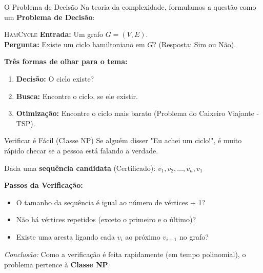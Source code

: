 \documentclass[10pt, aspectratio=169]{beamer}
\begin{document}
\begin{frame}{O Problema de Decisão}
    Na teoria da complexidade, formulamos a questão como um \textbf{Problema de Decisão}:
    
    \vspace{1em}
    \begin{block}{\textsc{HamCycle}}
        \textbf{Entrada:} Um grafo $G = (V, E)$.\\
        \textbf{Pergunta:} Existe um ciclo hamiltoniano em $G$? (Resposta: Sim ou Não).
    \end{block}
    
    \vspace{1em}
    \textbf{Três formas de olhar para o tema:}
    \begin{enumerate}
        \item \textbf{Decisão:} O ciclo existe?
        \item \textbf{Busca:} Encontre o ciclo, se ele existir.
        \item \textbf{Otimização:} Encontre o ciclo mais barato (Problema do Caixeiro Viajante - TSP).
    \end{enumerate}
\end{frame}

\begin{frame}{Verificar é Fácil (Classe NP)}
    Se alguém disser "Eu achei um ciclo!", é muito rápido checar se a pessoa está falando a verdade.
    
    \vspace{1em}
    Dada uma \textbf{sequência candidata} (Certificado): $v_1, v_2, \ldots, v_n, v_1$
    
    \vspace{1em}
    \textbf{Passos da Verificação:}
    \begin{itemize}
        \item O tamanho da sequência é igual ao número de vértices + 1?
        \item Não há vértices repetidos (exceto o primeiro e o último)?
        \item Existe uma aresta ligando cada $v_i$ ao próximo $v_{i+1}$ no grafo?
    \end{itemize}
    
    \vspace{1em}
    \textit{Conclusão:} Como a verificação é feita rapidamente (em tempo polinomial), o problema pertence à \textbf{Classe NP}.
\end{frame}
\end{document}
